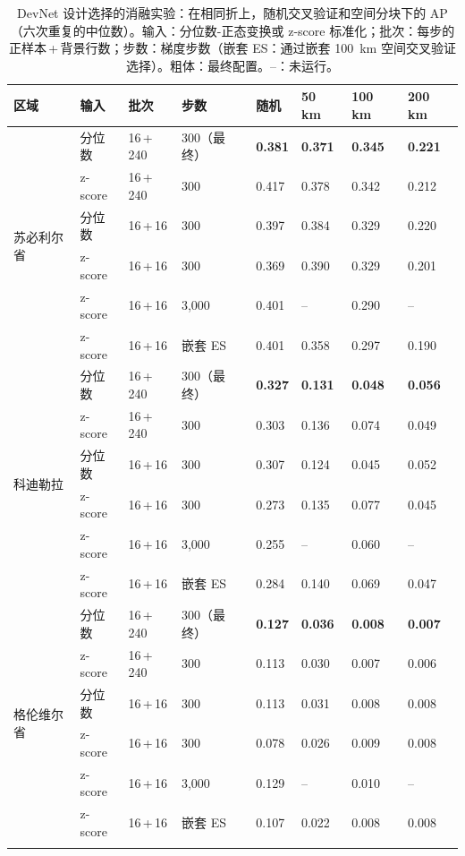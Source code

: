 \documentclass[pdflatex,sn-apa]{sn-jnl}
\begin{document}
\begin{appendices}
\begin{table}[!h]
\caption{DevNet 设计选择的消融实验：在相同折上，随机交叉验证和空间分块下的 AP（六次重复的中位数）。输入：分位数-正态变换或 z-score 标准化；批次：每步的正样本\,+\,背景行数；步数：梯度步数（嵌套 ES：通过嵌套 100~km 空间交叉验证选择）。粗体：最终配置。--：未运行。}\label{tab:ablation}
\scriptsize
\setlength{\tabcolsep}{2.5pt}
\begin{tabular*}{\textwidth}{@{\extracolsep\fill}llllllll}
\toprule
区域 & 输入 & 批次 & 步数 & 随机 & 50 km & 100 km & 200 km \\
\midrule
\multirow{6}{*}{苏必利尔省} & 分位数 & 16\,+\,240 & 300（最终） & \textbf{0.381} & \textbf{0.371} & \textbf{0.345} & \textbf{0.221} \\
 & z-score & 16\,+\,240 & 300 & 0.417 & 0.378 & 0.342 & 0.212 \\
 & 分位数 & 16\,+\,16 & 300 & 0.397 & 0.384 & 0.329 & 0.220 \\
 & z-score & 16\,+\,16 & 300 & 0.369 & 0.390 & 0.329 & 0.201 \\
 & z-score & 16\,+\,16 & 3,000 & 0.401 & -- & 0.290 & -- \\
 & z-score & 16\,+\,16 & 嵌套 ES & 0.401 & 0.358 & 0.297 & 0.190 \\
\midrule
\multirow{6}{*}{科迪勒拉} & 分位数 & 16\,+\,240 & 300（最终） & \textbf{0.327} & \textbf{0.131} & \textbf{0.048} & \textbf{0.056} \\
 & z-score & 16\,+\,240 & 300 & 0.303 & 0.136 & 0.074 & 0.049 \\
 & 分位数 & 16\,+\,16 & 300 & 0.307 & 0.124 & 0.045 & 0.052 \\
 & z-score & 16\,+\,16 & 300 & 0.273 & 0.135 & 0.077 & 0.045 \\
 & z-score & 16\,+\,16 & 3,000 & 0.255 & -- & 0.060 & -- \\
 & z-score & 16\,+\,16 & 嵌套 ES & 0.284 & 0.140 & 0.069 & 0.047 \\
\midrule
\multirow{6}{*}{格伦维尔省} & 分位数 & 16\,+\,240 & 300（最终） & \textbf{0.127} & \textbf{0.036} & \textbf{0.008} & \textbf{0.007} \\
 & z-score & 16\,+\,240 & 300 & 0.113 & 0.030 & 0.007 & 0.006 \\
 & 分位数 & 16\,+\,16 & 300 & 0.113 & 0.031 & 0.008 & 0.008 \\
 & z-score & 16\,+\,16 & 300 & 0.078 & 0.026 & 0.009 & 0.008 \\
 & z-score & 16\,+\,16 & 3,000 & 0.129 & -- & 0.010 & -- \\
 & z-score & 16\,+\,16 & 嵌套 ES & 0.107 & 0.022 & 0.008 & 0.008 \\
\botrule
\end{tabular*}
\end{table}


\end{appendices}
\end{document}
